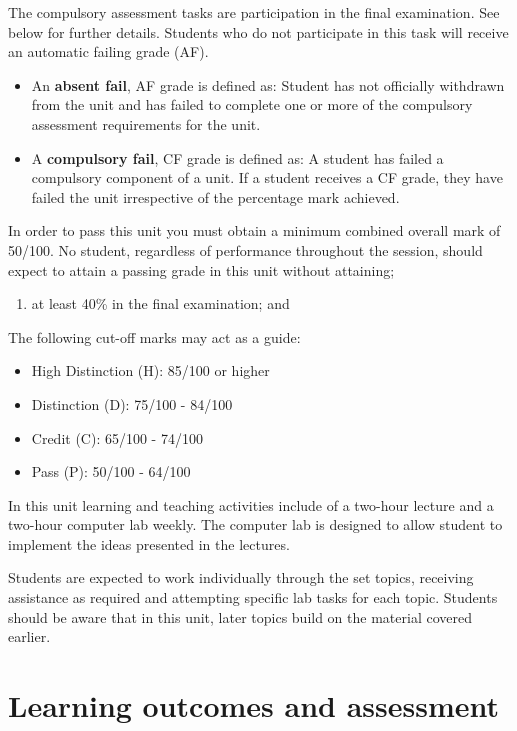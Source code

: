 \documentclass[a4paper,oneside]{book}
\begin{document}
The compulsory assessment tasks are participation in the final
examination. See below for further details. Students who do not
participate in this task will receive an automatic failing grade
(AF).
\begin{itemize}

\item An \textbf{absent fail}, AF grade is defined as: Student has not
officially withdrawn from the unit and has failed to complete one or
more of the compulsory assessment requirements for the unit.

\item A \textbf{compulsory fail}, CF grade is defined as: A student has
failed a compulsory component of a unit. If a student receives a CF
grade, they have failed the unit irrespective of the percentage mark
achieved.
\end{itemize}
In order to pass this unit you must obtain a minimum combined overall
mark of 50/100. No student, regardless of performance throughout the
session, should expect to attain a passing grade in this unit without
attaining;
\begin{enumerate}
\item at least 40\% in the final examination; and
\end{enumerate}
The following cut-off marks may act as a guide:
\begin{itemize}
\item High Distinction (H):            85/100 or higher
\item Distinction (D):                 75/100 - 84/100
\item Credit (C):                      65/100 - 74/100
\item Pass (P):                        50/100 - 64/100
\end{itemize}
In this unit learning and teaching activities include of a two-hour
lecture and a two-hour computer lab weekly. The computer lab is
designed to allow student to implement the ideas presented in the
lectures.

Students are expected to work individually through the set topics,
receiving assistance as required and attempting specific lab
tasks for each topic. Students should be aware that in this unit,
later topics build on the material covered earlier.


\section{Learning outcomes and assessment}
\end{document}
